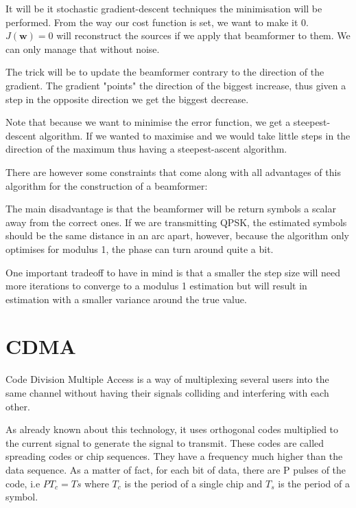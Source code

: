 \documentclass[12pt, a4paper]{article}
\begin{document}
It will be it stochastic gradient-descent techniques the minimisation will be performed. From the way our cost function is set, we want to make it 0. $J(\mathbf{w}) = 0$ will reconstruct the sources if we apply that beamformer to them. We can only manage that without noise.

The trick will be to update the beamformer contrary to the direction of the gradient. The gradient "points" the direction of the biggest increase, thus given a step in the opposite direction we get the biggest decrease.



Note that because we want to minimise the error function, we get a steepest-descent algorithm. If we wanted to maximise and we would take little steps in the direction of the maximum thus having a steepest-ascent algorithm.



There are however some constraints that come along with all advantages of this algorithm for the construction of a beamformer:



The main disadvantage is that the beamformer will be return symbols a scalar away from the correct ones. If we are transmitting QPSK, the estimated symbols should be the same distance in an arc apart, however, because the algorithm only optimises for modulus 1, the phase can turn around quite a bit.

One important tradeoff to have in mind is that a smaller the step size will need more iterations to converge to a modulus 1 estimation but will result in estimation with a smaller variance around the true value.






\section{CDMA}
\par Code Division Multiple Access is a way of multiplexing several users into the same channel without having their signals colliding and interfering with each other.

\par As already known about this technology, it uses orthogonal codes multiplied to the current signal to generate the signal to transmit. These codes are called spreading codes or chip sequences. They have a frequency much higher than the data sequence. As a matter of fact, for each bit of data, there are P pulses of the code, i.e $P T_c = Ts$ where $T_c$ is the period of a single chip and $T_s$ is the period of a symbol.
\end{document}
